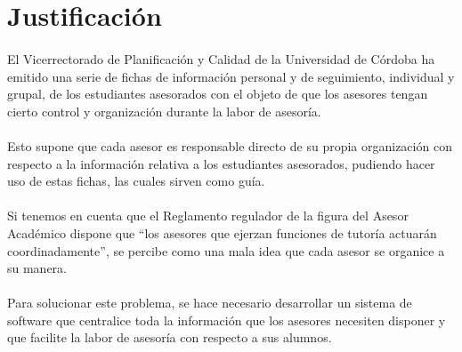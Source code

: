 \section{Justificación}

\paragraph{}El Vicerrectorado de Planificación y Calidad de la Universidad de
Córdoba ha emitido una serie de fichas de información personal y de seguimiento,
individual y grupal, de los estudiantes asesorados con el objeto de que los
asesores tengan cierto control y organización durante la labor de asesoría.

\paragraph{}Esto supone que cada asesor es responsable directo de su propia
organización con respecto a la información relativa a los estudiantes
asesorados, pudiendo hacer uso de estas fichas, las cuales sirven como guía.

\paragraph{}Si tenemos en cuenta que el Reglamento regulador de la figura del
Asesor Académico dispone que ``los asesores que ejerzan funciones de tutoría
actuarán coordinadamente'', se percibe como una mala idea que cada asesor se
organice a su manera.

\paragraph{}Para solucionar este problema, se hace necesario desarrollar un
sistema de software que centralice toda la información que los asesores
necesiten disponer y que facilite la labor de asesoría con respecto a sus
alumnos.
